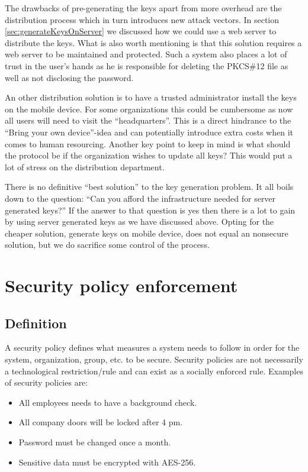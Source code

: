 The drawbacks of pre-generating the keys apart from more overhead are the distribution process which in turn introduces new attack vectors. In section \ref{sec:generateKeysOnServer} we discussed how we could use a web server to distribute the keys. What is also worth mentioning is that this solution requires a web server to be maintained and protected. Such a system also places a lot of trust in the user's hands as he is responsible for deleting the PKCS\#12 file as well as not disclosing the password.

An other distribution solution is to have a trusted administrator install the keys on the mobile device. For some organizations this could be cumbersome as now all users will need to visit the ``headquarters''. This is a direct hindrance to the ``Bring your own device''-idea and can potentially introduce extra costs when it comes to human resourcing. Another key point to keep in mind is what should the protocol be if the organization wishes to update all keys? This would put a lot of stress on the distribution department.

There is no definitive ``best solution'' to the key generation problem. It all boils down to the question: ``Can you afford the infrastructure needed for server generated keys?'' If the answer to that question is yes then there is a lot to gain by using server generated keys as we have discussed above. Opting for the cheaper solution, generate keys on mobile device, does not equal an nonsecure solution, but we do sacrifice some control of the process.


\section{Security policy enforcement}
\label{sec:policies}

\subsection{Definition}
A security policy defines what measures a system needs to follow in order for the system, organization, group, etc. to be secure. Security policies are not necessarily a technological restriction/rule and can exist as a socially enforced rule. Examples of security policies are:
\begin{itemize}
  \item All employees needs to have a background check.
  \item All company doors will be locked after 4 pm.
  \item Password must be changed once a month.
  \item Sensitive data must be encrypted with AES-256.
\end{itemize}

